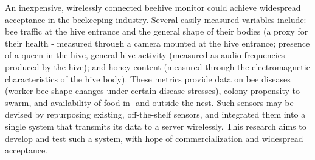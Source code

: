 An inexpensive, wirelessly connected beehive monitor could achieve widespread acceptance in the beekeeping industry. Several easily measured variables include: bee traffic at the hive entrance and the general shape of their bodies (a proxy for their health - measured through a camera mounted at the hive entrance; presence of a queen in the hive, general hive activity (measured as audio frequencies produced by the hive); and honey content (measured through the electromagnetic characteristics of the hive body). These metrics provide data on bee diseases (worker bee shape changes under certain disease stresses), colony propensity to swarm, and availability of food in- and outside the nest. Such sensors may be devised by repurposing existing, off-the-shelf sensors, and integrated them into a single system that transmits its data to a server wirelessly. This research aims to develop and test such a system, with hope of commercialization and widespread acceptance.
